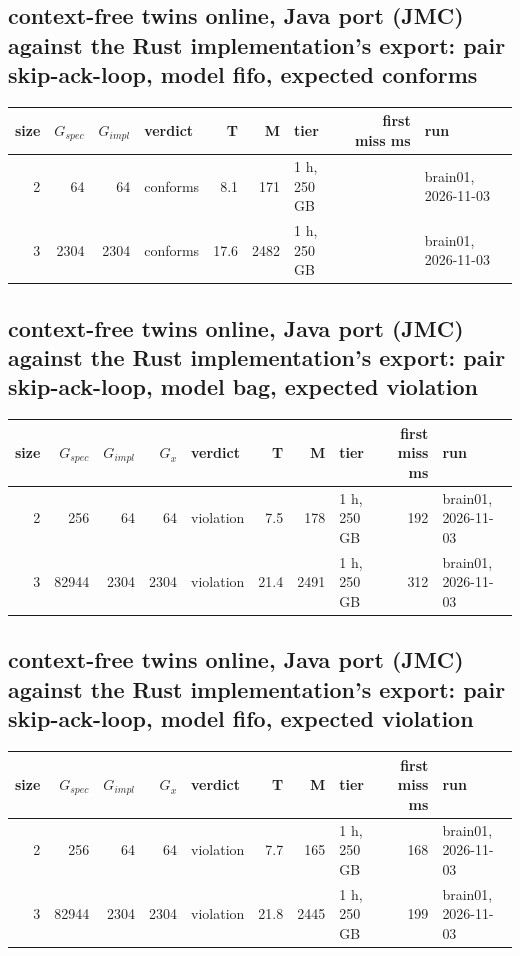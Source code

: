 \documentclass[10pt]{article}
\begin{document}
\subsection*{context-free twins online, Java port (JMC) against the Rust implementation's export: pair \textsf{skip-ack-loop}, model fifo, expected conforms}
\begin{longtable}{@{}rrrlrrlrl@{}}
\toprule
size & $G_{\mathit{spec}}$ & $G_{\mathit{impl}}$ & verdict & T & M & tier & first miss ms & run \\
\midrule
\endhead
\color{blue} 2 & 64 & 64 & conforms & 8.1 & 171 & 1 h, 250 GB &  & brain01, 2026-11-03 \\
\color{blue} 3 & 2304 & 2304 & conforms & 17.6 & 2482 & 1 h, 250 GB &  & brain01, 2026-11-03 \\
\bottomrule
\end{longtable}
\subsection*{context-free twins online, Java port (JMC) against the Rust implementation's export: pair \textsf{skip-ack-loop}, model bag, expected violation}
\begin{longtable}{@{}rrrrlrrlrl@{}}
\toprule
size & $G_{\mathit{spec}}$ & $G_{\mathit{impl}}$ & $G_x$ & verdict & T & M & tier & first miss ms & run \\
\midrule
\endhead
\color{blue} 2 & 256 & 64 & 64 & violation & 7.5 & 178 & 1 h, 250 GB & 192 & brain01, 2026-11-03 \\
\color{blue} 3 & 82944 & 2304 & 2304 & violation & 21.4 & 2491 & 1 h, 250 GB & 312 & brain01, 2026-11-03 \\
\bottomrule
\end{longtable}
\subsection*{context-free twins online, Java port (JMC) against the Rust implementation's export: pair \textsf{skip-ack-loop}, model fifo, expected violation}
\begin{longtable}{@{}rrrrlrrlrl@{}}
\toprule
size & $G_{\mathit{spec}}$ & $G_{\mathit{impl}}$ & $G_x$ & verdict & T & M & tier & first miss ms & run \\
\midrule
\endhead
\color{blue} 2 & 256 & 64 & 64 & violation & 7.7 & 165 & 1 h, 250 GB & 168 & brain01, 2026-11-03 \\
\color{blue} 3 & 82944 & 2304 & 2304 & violation & 21.8 & 2445 & 1 h, 250 GB & 199 & brain01, 2026-11-03 \\
\bottomrule
\end{longtable}
\end{document}
